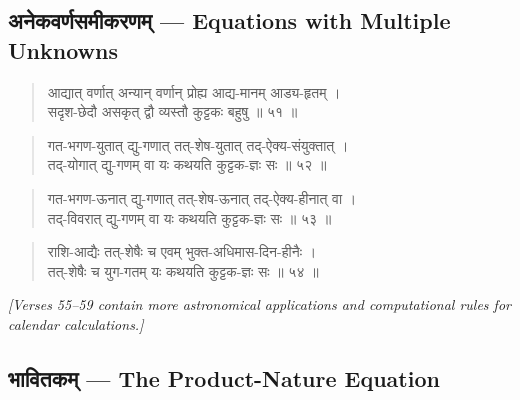 \documentclass[11pt,a4paper]{article}
\newcommand{\cnote}[1]{\textcolor{notecolor}{\textit{#1}}}
\newcommand{\dev}[1]{{\devanagarifont #1}}
\newenvironment{shloka}{\begin{verse}\devanagarifont\large}{\end{verse}}
\begin{document}
\subsection*{\dev{अनेकवर्णसमीकरणम् — Equations with Multiple Unknowns}}

\begin{shloka}
आद्यात् वर्णात् अन्यान् वर्णान् प्रोह्य आद्य-मानम् आड्य-हृतम् ।\\
सदृश-छेदौ असकृत् द्वौ व्यस्तौ कुट्टकः बहुषु ॥ ५१ ॥
\end{shloka}

\vspace{0.3cm}

\begin{shloka}
गत-भगण-युतात् द्यु-गणात् तत्-शेष-युतात् तद्-ऐक्य-संयुक्तात् ।\\
तद्-योगात् द्यु-गणम् वा यः कथयति कुट्टक-ज्ञः सः ॥ ५२ ॥
\end{shloka}

\vspace{0.3cm}

\begin{shloka}
गत-भगण-ऊनात् द्यु-गणात् तत्-शेष-ऊनात् तद्-ऐक्य-हीनात् वा ।\\
तद्-विवरात् द्यु-गणम् वा यः कथयति कुट्टक-ज्ञः सः ॥ ५३ ॥
\end{shloka}

\vspace{0.3cm}

\begin{shloka}
राशि-आद्यैः तत्-शेषैः च एवम् भुक्त-अधिमास-दिन-हीनैः ।\\
तत्-शेषैः च युग-गतम् यः कथयति कुट्टक-ज्ञः सः ॥ ५४ ॥
\end{shloka}

\vspace{0.5cm}
\cnote{[Verses 55–59 contain more astronomical applications and
computational rules for calendar calculations.]}

\newpage

\subsection*{\dev{भावितकम् — The Product-Nature Equation}}
\end{document}
